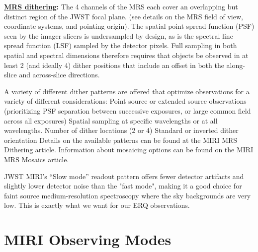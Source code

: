 \smallskip \smallskip
\noindent
{\bf \underline{MRS dithering}:} 
The 4 channels of the MRS each cover an overlapping but distinct
region of the JWST focal plane. (see details on the MRS field of view,
coordinate systems, and pointing origin).  The spatial point spread
function (PSF) seen by the imager slicers is undersampled by design,
as is the spectral line spread function (LSF) sampled by the detector
pixels.  Full sampling in both spatial and spectral dimensions
therefore requires that objects be observed in at least 2 (and ideally
4) dither positions that include an offset in both the along-slice and
across-slice directions.

A variety of different dither patterns are
offered that optimize observations for a variety of different
considerations: Point source or extended source observations
(prioritizing PSF separation between successive exposures, or large
common field across all exposures) Spatial sampling at specific
wavelengths or at all wavelengths.  Number of dither locations (2 or
4) Standard or inverted dither orientation Details on the available
patterns can be found at the MIRI MRS Dithering article.  Information
about mosaicing options can be found on the MIRI MRS Mosaics article.

JWST MIRI's ``Slow mode'' readout pattern offers fewer detector
artifacts and slightly lower detector noise than the "fast mode",
making it a good choice for faint source medium-resolution
spectroscopy where the sky backgrounds are very low. This is 
exactly what we want for our ERQ observations. 


\section{MIRI Observing Modes}
